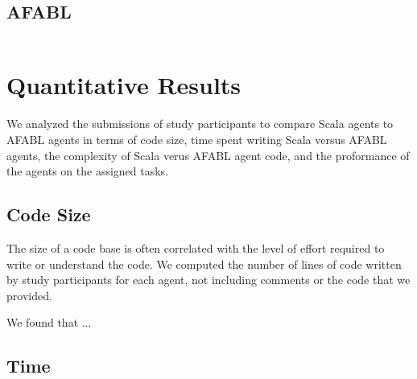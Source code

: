 \begin{figure}[ht]
\begin{center}

\begin{lstlisting}[language=Scala]

\end{lstlisting}

\caption{}
\end{center}
\label{fig:scala-task2-submission}
\end{figure}


\subsection{AFABL}

\begin{figure}[ht]
\begin{center}

\begin{lstlisting}[language=Scala]

\end{lstlisting}

\caption{}
\end{center}
\label{fig:afabl-task2-submission}
\end{figure}


\section{Quantitative Results}

We analyzed the submissions of study participants to compare Scala agents to AFABL agents in terms of code size, time spent writing Scala versus AFABL agents, the complexity of Scala verus AFABL agent code, and the proformance of the agents on the assigned tasks.

\subsection{Code Size}

The size of a code base is often correlated with the level of effort required to write or understand the code. We computed the number of lines of code written by study participants for each agent, not including comments or the code that we provided.

We found that ...

\subsection{Time}

